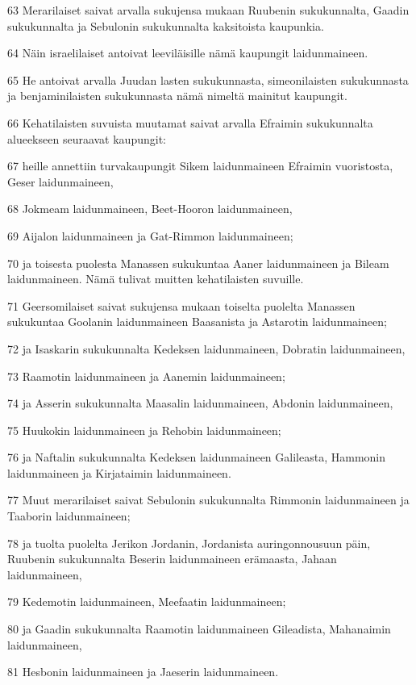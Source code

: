 \par 63 Merarilaiset saivat arvalla sukujensa mukaan Ruubenin sukukunnalta, Gaadin sukukunnalta ja Sebulonin sukukunnalta kaksitoista kaupunkia.
\par 64 Näin israelilaiset antoivat leeviläisille nämä kaupungit laidunmaineen.
\par 65 He antoivat arvalla Juudan lasten sukukunnasta, simeonilaisten sukukunnasta ja benjaminilaisten sukukunnasta nämä nimeltä mainitut kaupungit.
\par 66 Kehatilaisten suvuista muutamat saivat arvalla Efraimin sukukunnalta alueekseen seuraavat kaupungit:
\par 67 heille annettiin turvakaupungit Sikem laidunmaineen Efraimin vuoristosta, Geser laidunmaineen,
\par 68 Jokmeam laidunmaineen, Beet-Hooron laidunmaineen,
\par 69 Aijalon laidunmaineen ja Gat-Rimmon laidunmaineen;
\par 70 ja toisesta puolesta Manassen sukukuntaa Aaner laidunmaineen ja Bileam laidunmaineen. Nämä tulivat muitten kehatilaisten suvuille.
\par 71 Geersomilaiset saivat sukujensa mukaan toiselta puolelta Manassen sukukuntaa Goolanin laidunmaineen Baasanista ja Astarotin laidunmaineen;
\par 72 ja Isaskarin sukukunnalta Kedeksen laidunmaineen, Dobratin laidunmaineen,
\par 73 Raamotin laidunmaineen ja Aanemin laidunmaineen;
\par 74 ja Asserin sukukunnalta Maasalin laidunmaineen, Abdonin laidunmaineen,
\par 75 Huukokin laidunmaineen ja Rehobin laidunmaineen;
\par 76 ja Naftalin sukukunnalta Kedeksen laidunmaineen Galileasta, Hammonin laidunmaineen ja Kirjataimin laidunmaineen.
\par 77 Muut merarilaiset saivat Sebulonin sukukunnalta Rimmonin laidunmaineen ja Taaborin laidunmaineen;
\par 78 ja tuolta puolelta Jerikon Jordanin, Jordanista auringonnousuun päin, Ruubenin sukukunnalta Beserin laidunmaineen erämaasta, Jahaan laidunmaineen,
\par 79 Kedemotin laidunmaineen, Meefaatin laidunmaineen;
\par 80 ja Gaadin sukukunnalta Raamotin laidunmaineen Gileadista, Mahanaimin laidunmaineen,
\par 81 Hesbonin laidunmaineen ja Jaeserin laidunmaineen.

